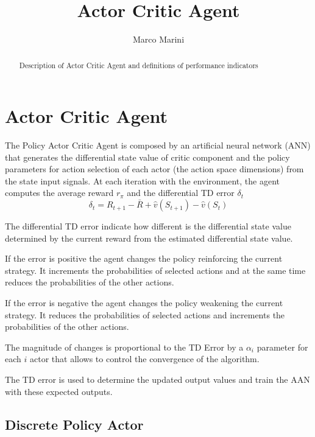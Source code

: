 \documentclass[]{article}
\title{Actor Critic Agent}
\author{Marco Marini}
\begin{document}
\maketitle

\begin{abstract}
Description of Actor Critic Agent and definitions of performance indicators
\end{abstract}

\tableofcontents

\section{Actor Critic Agent}

The Policy Actor Critic Agent is composed by an artificial neural network (ANN) that generates the differential state value of critic component and the policy parameters for action selection of each actor (the action space dimensions) from the state input signals.
At each iteration with the environment, the agent computes the average reward $r_\pi$ and the differential TD error $ \delta_t $
\begin{equation}
\delta_t = R_{t+1} - \bar R + \hat v(S_{t+1}) - \hat v(S_t)	
\end{equation}

The differential TD error indicate how different is the differential state value determined by the current reward from the estimated differential state value.

If the error is positive the agent changes the policy reinforcing the current strategy. It increments the probabilities of selected actions and at the same time reduces the probabilities of the other actions.

If the error is negative the agent changes the policy weakening the current strategy. It reduces the probabilities of selected actions and increments the probabilities of the other actions.

The magnitude of changes is proportional to the TD Error by a $ \alpha_i $ parameter for each $ i $ actor that allows to control the convergence of the algorithm.

The TD error is used to determine the updated output values and train the AAN with these expected outputs.

\subsection{Discrete Policy Actor}
\end{document}
